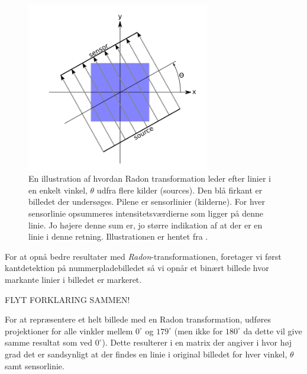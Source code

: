 \begin{figure}[htp]
  \centering
  \includegraphics[width=8cm]{system/illu/radon.png}
  \caption{En illustration af hvordan Radon transformation leder efter linier i en enkelt vinkel, $\theta$ udfra flere kilder (sources). Den blå firkant er billedet der undersøges. Pilene er sensorlinier (kilderne). For hver sensorlinie opsummeres intensitetsværdierne som ligger på denne linie. Jo højere denne sum er, jo større indikation af at der er en linie i denne retning. Illustrationen er hentet fra \cite{matlab_radon}.}
  \label{fig:radon_transform}
\end{figure}

For at opnå bedre resultater med \textit{Radon}-transformationen, foretager vi først kantdetektion på nummerpladebilledet så vi opnår et binært billede hvor markante linier i billedet er markeret.

FLYT FORKLARING SAMMEN!

For at repræsentere et helt billede med en Radon transformation, udføres projektioner for alle vinkler mellem $0^{\circ}$ og $179^{\circ}$ (men ikke for $180^{\circ}$ da dette vil give samme resultat som ved $0^{\circ}$). Dette resulterer i en matrix der angiver i hvor høj grad det er sandsynligt at der findes en linie i original billedet for hver vinkel, $\theta$ samt sensorlinie. %


